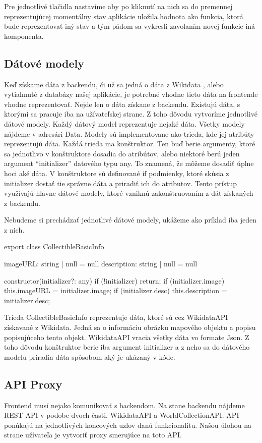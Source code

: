 Pre jednotlivé tlačidla nastavíme aby po kliknutí na nich sa do premennej reprezentujúcej momentálny stav 
aplikácie uložila hodnota ako funkcia, ktorá bude reprezentovať iný stav a tým pádom sa vykresli zavolaním novej funkcie iná komponenta. 

\subsection*{Dátové modely}
Keď získame dáta z backendu, či už sa jedná o dáta z Wikidata , alebo vytiahnuté z databázy našej aplikácie, je potrebné vhodne tieto dáta na frontende vhodne reprezentovať.  
Nejde len o dáta získane z backendu. Existujú dáta, s ktorými sa pracuje iba na užívateľskej strane. Z toho dôvodu vytvoríme jednotlivé dátové modely. 
Každý dátový model reprezentuje nejaké dáta. Všetky modely nájdeme v adresári Data. Modely sú implementovane ako trieda, kde jej atribúty reprezentujú dáta. 
Každá trieda ma konštruktor. Ten buď berie argumenty, ktoré sa jednotlivo v konštruktore dosadia do atribútov, alebo niektoré berú jeden argument “initializer” datového typu any.
To znamená, že môžeme dosadiť úplne hoci aké dáta. V konštruktore sú definované if podmienky, ktoré skúsia z initializer dostať tie správne dáta a priradiť ich do atributov. 
Tento prístup využívajú hlavne dátové modely, ktoré vzniknú zakonštruovaním z dát získaných z backendu. 

Nebudeme si prechádzať jednotlivé dátové modely, ukážeme ako príklad iba jeden z nich. 
\begin{code}
export class CollectibleBasicInfo {
    imageURL: string | null = null
    description: string | null = null

    constructor(initializer?: any) {
        if (!initializer) return;
        if (initializer.image) this.imageURL = initializer.image;
        if (initializer.desc) this.description = initializer.desc;
    }
}
\end{code}

Trieda CollectibleBasicInfo reprezentuje dáta, ktoré sú cez WikidataAPI získavané z Wikidata. Jedná sa o informáciu obrázku mapového objektu a popisu popisujúceho tento objekt. 
WikidataAPI vracia všetky dáta vo formate Json. Z toho dôvodu konštruktor berie iba argument initializer a z neho sa do dátového modelu priradia dáta spôsobom aký je ukázaný v kóde. 

\subsection*{API Proxy}
Frontend musí nejako komunikovať s backendom. Na stane backendu nájdeme REST API v podobe dvoch časti. WikidataAPI a WorldCollectionAPI. API ponúkajú na jednotlivých koncových uzlov  
danú funkcionalitu. Našou úlohou na strane užívateľa je vytvoriť proxy smerujúce na toto API. 

